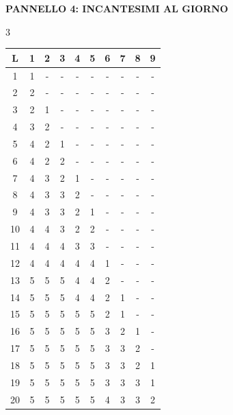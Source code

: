\documentclass[10pt,a4paper,landscape]{article}
\newcommand{\pageheader}[1]{%
	\noindent\colorbox{headerblue}{%
		\parbox{\dimexpr\textwidth-2\fboxsep\relax}{%
			\centering\color{white}\Large\bfseries #1
		}%
	}%
	\vspace{4pt}
}
\newcommand{\sectiontitle}[1]{%
	\vspace{3pt}
	\noindent{\normalsize\bfseries #1}
	\vspace{1pt}
}
\begin{document}
	\clearpage


	\pageheader{PANNELLO 4: INCANTESIMI AL GIORNO}

	\begin{multicols}{3}

		\sectiontitle{Mago}

		\scriptsize
		\noindent
		\begin{tabular}{c|ccccccccc}
			\toprule
			\rowcolor{lightgray}
			\textbf{L} & \textbf{1} & \textbf{2} & \textbf{3} & \textbf{4} & \textbf{5} & \textbf{6} & \textbf{7} & \textbf{8} & \textbf{9} \\
			\midrule
			1 & 1 & - & - & - & - & - & - & - & - \\
			\rowcolor{lightgray}
			2 & 2 & - & - & - & - & - & - & - & - \\
			3 & 2 & 1 & - & - & - & - & - & - & - \\
			\rowcolor{lightgray}
			4 & 3 & 2 & - & - & - & - & - & - & - \\
			5 & 4 & 2 & 1 & - & - & - & - & - & - \\
			\rowcolor{lightgray}
			6 & 4 & 2 & 2 & - & - & - & - & - & - \\
			7 & 4 & 3 & 2 & 1 & - & - & - & - & - \\
			\rowcolor{lightgray}
			8 & 4 & 3 & 3 & 2 & - & - & - & - & - \\
			9 & 4 & 3 & 3 & 2 & 1 & - & - & - & - \\
			\rowcolor{lightgray}
			10 & 4 & 4 & 3 & 2 & 2 & - & - & - & - \\
			11 & 4 & 4 & 4 & 3 & 3 & - & - & - & - \\
			\rowcolor{lightgray}
			12 & 4 & 4 & 4 & 4 & 4 & 1 & - & - & - \\
			13 & 5 & 5 & 5 & 4 & 4 & 2 & - & - & - \\
			\rowcolor{lightgray}
			14 & 5 & 5 & 5 & 4 & 4 & 2 & 1 & - & - \\
			15 & 5 & 5 & 5 & 5 & 5 & 2 & 1 & - & - \\
			\rowcolor{lightgray}
			16 & 5 & 5 & 5 & 5 & 5 & 3 & 2 & 1 & - \\
			17 & 5 & 5 & 5 & 5 & 5 & 3 & 3 & 2 & - \\
			\rowcolor{lightgray}
			18 & 5 & 5 & 5 & 5 & 5 & 3 & 3 & 2 & 1 \\
			19 & 5 & 5 & 5 & 5 & 5 & 3 & 3 & 3 & 1 \\
			\rowcolor{lightgray}
			20 & 5 & 5 & 5 & 5 & 5 & 4 & 3 & 3 & 2 \\
			\bottomrule
		\end{tabular}


\end{multicols}
\end{document}
